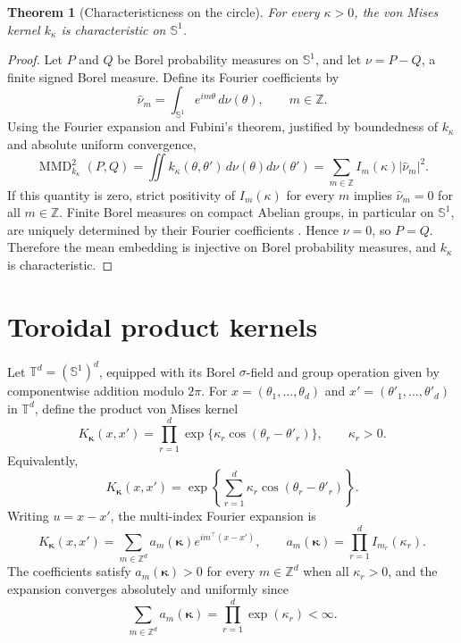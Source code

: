 \documentclass[11pt]{article}
\newtheorem{theorem}{Theorem}
\newcommand{\Sone}{\mathbb S^1}
\newcommand{\Td}{\mathbb T^d}
\newcommand{\MMD}{\operatorname{MMD}}
\begin{document}
\begin{theorem}[Characteristicness on the circle]
For every \(\kappa>0\), the von Mises kernel \(k_\kappa\) is characteristic on \(\Sone\).
\end{theorem}

\begin{proof}
Let \(P\) and \(Q\) be Borel probability measures on \(\Sone\), and let \(\nu=P-Q\), a finite signed Borel measure.  Define its Fourier coefficients by
\[
  \widehat\nu_m=\int_{\Sone} e^{im\theta}\,d\nu(\theta),
  \qquad m\in\mathbb Z.
\]
Using the Fourier expansion and Fubini's theorem, justified by boundedness of \(k_\kappa\) and absolute uniform convergence,
\[
\MMD^2_{k_\kappa}(P,Q)
=
\iint k_\kappa(\theta,\theta')\,d\nu(\theta)d\nu(\theta')
=
\sum_{m\in\mathbb Z} I_m(\kappa)|\widehat\nu_m|^2.
\]
If this quantity is zero, strict positivity of \(I_m(\kappa)\) for every \(m\) implies \(\widehat\nu_m=0\) for all \(m\in\mathbb Z\).  Finite Borel measures on compact Abelian groups, in particular on \(\Sone\), are uniquely determined by their Fourier coefficients \citep{rudin1962fourier,fukumizu2009groups}.  Hence \(\nu=0\), so \(P=Q\).  Therefore the mean embedding is injective on Borel probability measures, and \(k_\kappa\) is characteristic.
\end{proof}

\section{Toroidal product kernels}

Let \(\Td=(\Sone)^d\), equipped with its Borel \(\sigma\)-field and group operation given by componentwise addition modulo \(2\pi\).  For \(x=(\theta_1,\ldots,\theta_d)\) and \(x'=(\theta'_1,\ldots,\theta'_d)\) in \(\Td\), define the product von Mises kernel
\[
  K_{\boldsymbol\kappa}(x,x')
  =
  \prod_{r=1}^d \exp\{\kappa_r\cos(\theta_r-\theta'_r)\},
  \qquad \kappa_r>0.
\]
Equivalently,
\[
  K_{\boldsymbol\kappa}(x,x')
  =
  \exp\left\{\sum_{r=1}^d\kappa_r\cos(\theta_r-\theta'_r)\right\}.
\]
Writing \(u=x-x'\), the multi-index Fourier expansion is
\[
  K_{\boldsymbol\kappa}(x,x')
  =
  \sum_{m\in\mathbb Z^d}
  a_m(\boldsymbol\kappa)e^{i m^\top (x-x')},
  \qquad
  a_m(\boldsymbol\kappa)=\prod_{r=1}^d I_{m_r}(\kappa_r).
\]
The coefficients satisfy \(a_m(\boldsymbol\kappa)>0\) for every \(m\in\mathbb Z^d\) when all \(\kappa_r>0\), and the expansion converges absolutely and uniformly since
\[
  \sum_{m\in\mathbb Z^d} a_m(\boldsymbol\kappa)
  =
  \prod_{r=1}^d \exp(\kappa_r)<\infty .
\]
\end{document}
